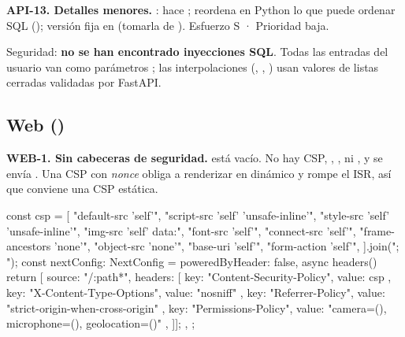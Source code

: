 \textbf{API-13. Detalles menores.} :  hace ;  reordena en Python lo que puede ordenar SQL (); versión fija  en  (tomarla de ). Esfuerzo S · Prioridad baja.

Seguridad: \textbf{no se han encontrado inyecciones SQL}. Todas las entradas del usuario van como parámetros ; las interpolaciones (, , ) usan valores de listas cerradas validadas por FastAPI.

\subsection{Web ()}

\textbf{WEB-1. Sin cabeceras de seguridad.}  está vacío. No hay CSP, , ,  ni , y se envía . Una CSP con \emph{nonce} obliga a renderizar en dinámico y rompe el ISR, así que conviene una CSP estática.

\begin{codigo}
const csp = [
  "default-src 'self'", "script-src 'self' 'unsafe-inline'", "style-src 'self' 'unsafe-inline'",
  "img-src 'self' data:", "font-src 'self'", "connect-src 'self'",
  "frame-ancestors 'none'", "object-src 'none'", "base-uri 'self'", "form-action 'self'",
].join("; ");
const nextConfig: NextConfig = {
  poweredByHeader: false,
  async headers() {
    return [{ source: "/:path*", headers: [
      { key: "Content-Security-Policy", value: csp },
      { key: "X-Content-Type-Options", value: "nosniff" },
      { key: "Referrer-Policy", value: "strict-origin-when-cross-origin" },
      { key: "Permissions-Policy", value: "camera=(), microphone=(), geolocation=()" },
    ]}];
  },
};
\end{codigo}

